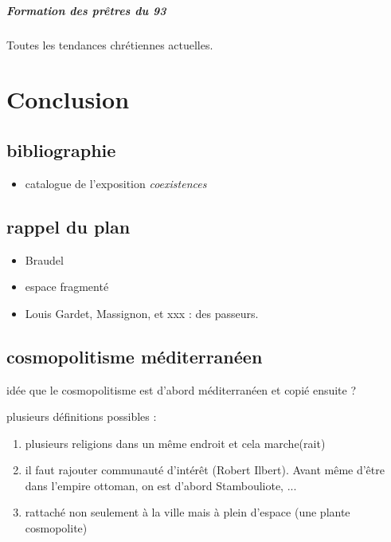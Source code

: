 \paragraph{Formation des prêtres du 93} Toutes les tendances chrétiennes actuelles.

\chapter{Conclusion}


\section{bibliographie}
\begin{itemize}
    \item catalogue de l'exposition \textit{coexistences}
\end{itemize}
\section{rappel du plan}
\begin{itemize}
    \item Braudel
    \item espace fragmenté
    \item Louis Gardet, Massignon, et xxx : des passeurs.
\end{itemize}

\section{cosmopolitisme méditerranéen}

\begin{Synthesis}
    idée que le cosmopolitisme est d'abord méditerranéen et copié ensuite ?
\end{Synthesis}

\begin{Def}
plusieurs définitions possibles :
\begin{enumerate}
     \item plusieurs religions dans un même endroit et cela marche(rait)  
    \item il faut rajouter communauté d'intérêt (Robert Ilbert). Avant même d'être dans l'empire ottoman, on est d'abord Stambouliote, ...
  \item rattaché non seulement à la ville mais à plein d'espace (une plante cosmopolite)
\end{enumerate}
 \end{Def}

